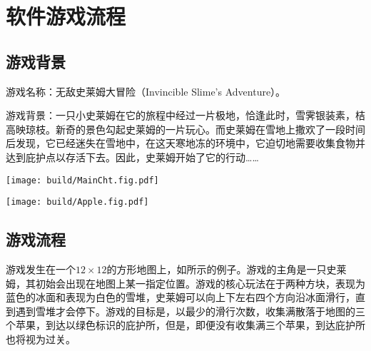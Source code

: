 \section{软件游戏流程}

\subsection{游戏背景}
游戏名称：无敌史莱姆大冒险（Invincible Slime's Adventure）。

游戏背景：一只小史莱姆在它的旅程中经过一片极地，恰逢此时，雪霁银装素，桔高映琼枝。新奇的景色勾起史莱姆的一片玩心。而史莱姆在雪地上撒欢了一段时间后发现，它已经迷失在雪地中，在这天寒地冻的环境中，它迫切地需要收集食物并达到庇护点以存活下去。因此，史莱姆开始了它的行动……

\begin{Figure}[游戏角色设计]
    \begin{FigureSub}[史莱姆]
        \texttt{[image: build/MainCht.fig.pdf]}
    \end{FigureSub}
    \hspace{2cm}
    \begin{FigureSub}[苹果]
        \texttt{[image: build/Apple.fig.pdf]}
    \end{FigureSub}
\end{Figure}

\subsection{游戏流程}

游戏发生在一个$12\times 12$的方形地图上，如所示的例子。游戏的主角是一只史莱姆，其初始会出现在地图上某一指定位置。游戏的核心玩法在于两种方块，表现为蓝色的冰面和表现为白色的雪堆，史莱姆可以向上下左右四个方向沿冰面滑行，直到遇到雪堆才会停下。游戏的目标是，以最少的滑行次数，收集满散落于地图的三个苹果，到达以绿色标识的庇护所，但是，即便没有收集满三个苹果，到达庇护所也将视为过关。

